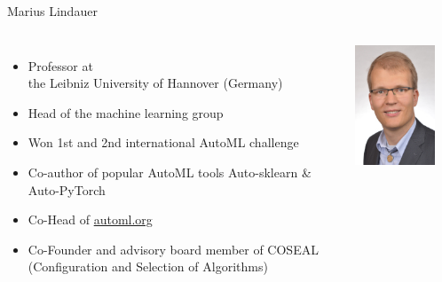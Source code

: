 \begin{frame}[c]{Marius Lindauer}

\begin{columns}
	
	
	\begin{itemize}
		\item Professor at\\ the Leibniz University of Hannover (Germany)
		\item Head of the machine learning group
		\item Won 1st and 2nd international AutoML challenge
		\item Co-author of popular AutoML tools Auto-sklearn \& Auto-PyTorch
		\item Co-Head of \url{automl.org}
		\item Co-Founder and advisory board member of COSEAL\\ (Configuration and Selection of Algorithms)
	\end{itemize}
	
	
	\includegraphics[width=0.8\textwidth]{images/lindauer.jpg}
	
\end{columns}

\end{frame}

